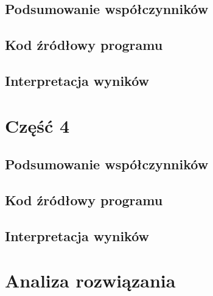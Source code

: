 \documentclass[
	12pt, %
]{fphw}
\begin{document}
\subsection{Podsumowanie współczynników}
\subsection{Kod źródłowy programu}
\subsection{Interpretacja wyników}
\section{Część 4}
\subsection{Podsumowanie współczynników}
\subsection{Kod źródłowy programu}
\subsection{Interpretacja wyników}
\section{Analiza rozwiązania}
\end{document}

